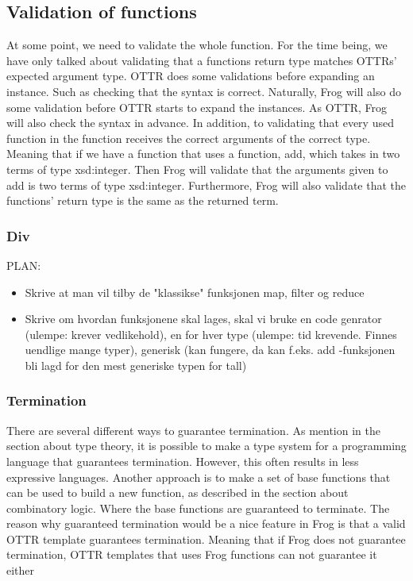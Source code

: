 \subsection{Validation of functions}
At some point, we need to validate the whole function. For the time being, we have only talked about validating that a functions return type matches OTTRs' expected argument type.  OTTR does some validations before expanding an instance. Such as checking that the syntax is correct. Naturally, Frog will also do some validation before OTTR starts to expand the instances. As OTTR, Frog will also check the syntax in advance. In addition, to validating that every used function in the function receives the correct arguments of the correct type. Meaning that if we have a function that uses a function, add, which takes in two terms of type xsd:integer. Then Frog will validate that the arguments given to add is two terms of type xsd:integer. Furthermore, Frog will also validate that the functions' return type is the same as the returned term.

\subsubsection{Div}
PLAN:
\begin{itemize}
    \item Skrive at man vil tilby de "klassikse" funksjonen map, filter og reduce
    \item Skrive om hvordan funksjonene skal lages, skal vi bruke en code genrator (ulempe: krever vedlikehold), en for hver type (ulempe: tid krevende. Finnes uendlige mange typer), generisk (kan fungere, da kan f.eks. add -funksjonen bli lagd for den mest generiske typen for tall)
\end{itemize}

\subsubsection{Termination}
There are several different ways to guarantee termination. As mention in the section about type theory, 
it is possible to make a type system for a programming language that guarantees termination. However, this often results in less expressive languages. 
Another approach is to make a set of base functions that can be used to build a new function, as described in the section about combinatory logic. 
Where the base functions are guaranteed to terminate. The reason why guaranteed termination would be a nice feature in Frog is that a valid OTTR template guarantees termination. 
Meaning that if Frog does not guarantee termination, OTTR templates that uses Frog functions can not guarantee it either


